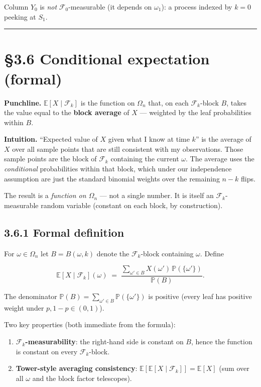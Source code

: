 \documentclass[
  10pt,
  twoside]{book}
\providecommand{\tightlist}{%
  \setlength{\itemsep}{0pt}\setlength{\parskip}{0pt}}
\begin{document}
Column \(Y_0\) is \emph{not} \(\mathcal F_0\)-measurable (it depends on
\(\omega_1\)): a process indexed by \(k=0\) peeking at \(S_1\).

\begin{center}\rule{0.5\linewidth}{0.5pt}\end{center}

\section{§3.6 Conditional expectation
(formal)}\label{conditional-expectation-formal}

\textbf{Punchline.} \(\mathbb E[X \mid \mathcal F_k]\) is the function
on \(\Omega_n\) that, on each \(\mathcal F_k\)-block \(B\), takes the
value equal to the \textbf{block average} of \(X\) --- weighted by the
leaf probabilities within \(B\).

\textbf{Intuition.} ``Expected value of \(X\) given what I know at time
\(k\)'' is the average of \(X\) over all sample points that are still
consistent with my observations. Those sample points are the block of
\(\mathcal F_k\) containing the current \(\omega\). The average uses the
\emph{conditional} probabilities within that block, which under our
independence assumption are just the standard binomial weights over the
remaining \(n-k\) flips.

The result is a \emph{function on \(\Omega_n\)} --- not a single number.
It is itself an \(\mathcal F_k\)-measurable random variable (constant on
each block, by construction).

\subsection{3.6.1 Formal definition}\label{formal-definition}

For \(\omega \in \Omega_n\) let \(B = B(\omega, k)\) denote the
\(\mathcal F_k\)-block containing \(\omega\). Define

\[\mathbb E[X \mid \mathcal F_k](\omega) \;=\; \frac{\sum_{\omega' \in B} X(\omega')\, \mathbb P(\{\omega'\})}{\mathbb P(B)}.\]

The denominator
\(\mathbb P(B) = \sum_{\omega' \in B}\mathbb P(\{\omega'\})\) is
positive (every leaf has positive weight under \(p, 1-p \in (0,1)\)).

Two key properties (both immediate from the formula):

\begin{enumerate}
\def\labelenumi{\arabic{enumi}.}
\tightlist
\item
  \textbf{\(\mathcal F_k\)-measurability}: the right-hand side is
  constant on \(B\), hence the function is constant on every
  \(\mathcal F_k\)-block.
\item
  \textbf{Tower-style averaging consistency}:
  \(\mathbb E[\mathbb E[X \mid \mathcal F_k]] = \mathbb E[X]\) (sum over
  all \(\omega\) and the block factor telescopes).
\end{enumerate}
\end{document}
